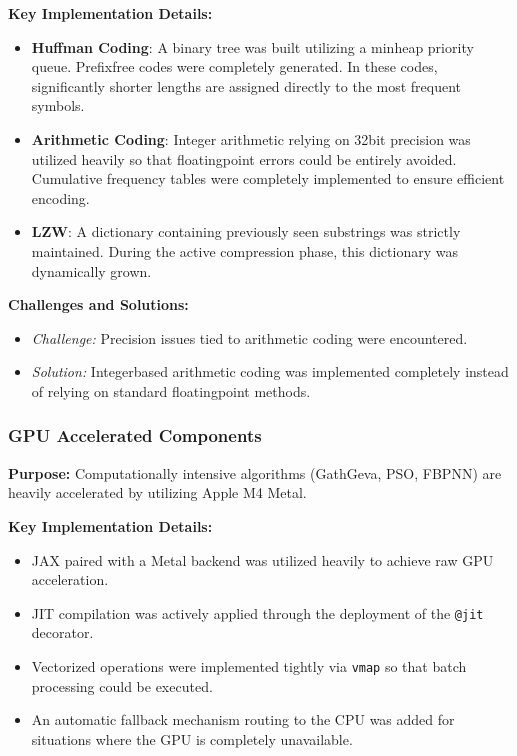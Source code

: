 \textbf{Key Implementation Details:}
\begin{itemize}
    \item \textbf{Huffman Coding}: A binary tree was built utilizing a minheap priority queue. Prefixfree codes were completely generated. In these codes, significantly shorter lengths are assigned directly to the most frequent symbols.
    \item \textbf{Arithmetic Coding}: Integer arithmetic relying on 32bit precision was utilized heavily so that floatingpoint errors could be entirely avoided. Cumulative frequency tables were completely implemented to ensure efficient encoding.
    \item \textbf{LZW}: A dictionary containing previously seen substrings was strictly maintained. During the active compression phase, this dictionary was dynamically grown.
\end{itemize}

\textbf{Challenges and Solutions:}
\begin{itemize}
    \item \textit{Challenge:} Precision issues tied to arithmetic coding were encountered.
    \item \textit{Solution:} Integerbased arithmetic coding was implemented completely instead of relying on standard floatingpoint methods.
\end{itemize}

\subsubsection{GPU Accelerated Components}

\textbf{Purpose:} Computationally intensive algorithms (GathGeva, PSO, FBPNN) are heavily accelerated by utilizing Apple M4 Metal.

\textbf{Key Implementation Details:}
\begin{itemize}
    \item JAX paired with a Metal backend was utilized heavily to achieve raw GPU acceleration.
    \item JIT compilation was actively applied through the deployment of the \texttt{@jit} decorator.
    \item Vectorized operations were implemented tightly via \texttt{vmap} so that batch processing could be executed.
    \item An automatic fallback mechanism routing to the CPU was added for situations where the GPU is completely unavailable.
\end{itemize}

